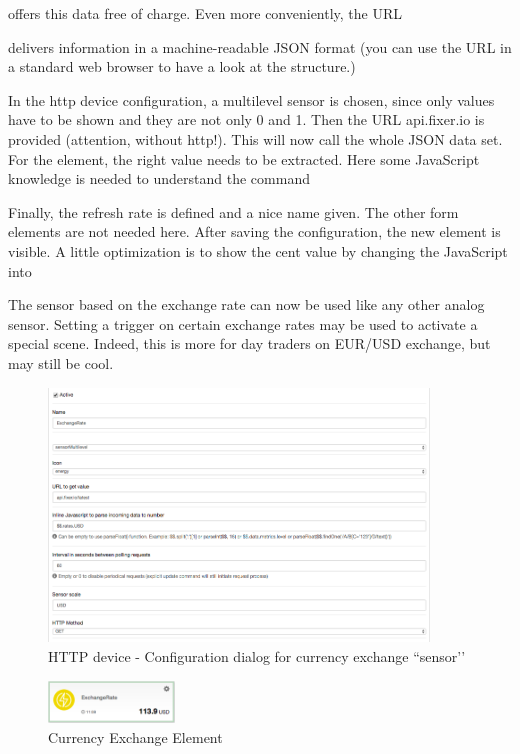 
offers this data free of charge. Even more conveniently, the URL 


delivers information in a 
machine-readable JSON format (you can use the URL in a standard web browser to have a 
look at the structure.)


In the http device configuration, a multilevel sensor is chosen, since only values 
have to be shown and they are not only 0 and 1. Then the URL api.fixer.io is provided 
(attention, without http!). This will now call the whole JSON data set. For the element, 
the right value needs to be extracted. Here some JavaScript knowledge is needed to 
understand the command 


Finally, the refresh rate is defined and a 
nice name given. The other form elements are not needed here.
After saving the configuration, the new element is visible. A little optimization is to 
show the cent value by changing the JavaScript into 


The sensor based on the exchange rate can now be used like any other analog sensor. 
Setting a trigger on certain exchange rates may be used to activate a special scene. 
Indeed, this is more for day traders on EUR/USD exchange, but may still be cool.


\begin{figure}
\begin{center}
\includegraphics[width=0.9\textwidth]{pngs/cap6/app29.png}
\caption{HTTP device - Configuration dialog for currency exchange ``sensor’’}
\label{app29}
\end{center}
\end{figure}

\begin{figure}
\begin{center}
\includegraphics[width=0.3\textwidth]{pngs/cap6/app30.png}
\caption{Currency Exchange Element}
\label{app30}
\end{center}
\end{figure}
